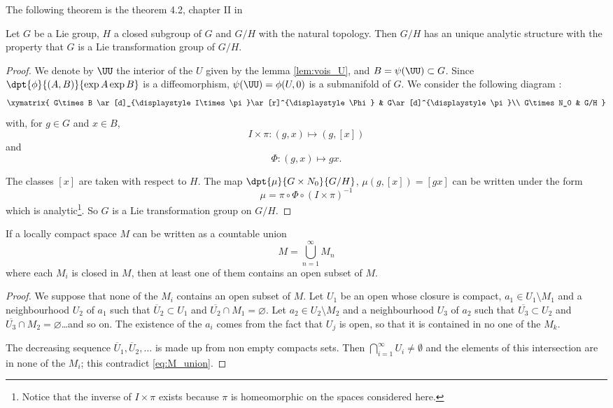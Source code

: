 The following theorem is the theorem 4.2, chapter II in \cite{Helgason}
\begin{theorem}\label{Helgason4.2}\label{tho:struc_anal}
Let $G$ be a Lie group, $H$ a closed subgroup of $G$ and $G/H$ with the natural topology. Then $G/H$ has an unique analytic structure with the property that $G$ is a Lie transformation group of $G/H$.
\end{theorem}

\begin{proof}
We denote by $\UU$ the interior of the $U$ given by the lemma \ref{lem:vois_U}, and $B=\psi(\UU)\subset G$. Since $\dpt{\phi}{(A,B)}{\exp A\exp B}$ is a diffeomorphism, $\psi(\UU)=\phi(U,0)$ is a submanifold of $G$. We consider the following diagram :
\[
\xymatrix{
    G\times B  \ar[d]_{\displaystyle I\times\pi}\ar[r]^{\displaystyle\Phi}    &     
                                                                     G\ar[d]^{\displaystyle\pi}\\
    G\times N_0 &                                                             G/H
  }\]
with, for $g\in G$ and $x\in B$,
\[
I\times\pi\colon (g,x)\mapsto (g,[x])
\]
and
\[
\Phi\colon (g,x)\mapsto gx.
\]

\noindent The classes $[x]$ are taken with respect to $H$. The map $\dpt{\mu}{G\times N_0}{G/H}$, $\mu(g,[x])=[gx]$ can be written under the form
\[
   \mu=\pi\circ\Phi\circ(I\times\pi)^{-1}
\]
which is analytic\footnote{Notice that the inverse of $I\times\pi$ exists because $\pi$ is homeomorphic on the spaces considered here.}. So $G$ is a Lie transformation group on $G/H$.

\end{proof}


\begin{lemma} \label{lem:categ}
If a locally compact space $M$ can be written as a countable union
\begin{equation}\label{eq:M_union}
   M=\bigcup_{n=1}^{\infty}M_n
\end{equation}
where each $M_i$ is closed in $M$, then at least one of them contains an open subset of $M$.
\end{lemma}

\begin{proof}
We suppose that none of the $M_i$ contains an open subset of $M$. Let $U_1$ be an open whose closure is compact, $a_1\in U_1\setminus M_1$ and a neighbourhood $U_2$ of $a_1$ such that $\overline{U}_2\subset U_1$ and $\overline{U_2}\cap M_1=\varnothing$. Let $a_2\in U_2\setminus M_2$ and a neighbourhood $U_3$ of $a_2$ such that $\overline{U_3}\subset U_2$ and $\overline{U_3}\cap M_2=\varnothing$\ldots and so on. The existence of the $a_i$ comes from the fact that $U_j$ is open, so that it is contained in no one of the $M_k$.

The decreasing sequence $\overline{U}_1,\overline{U}_2 ,\ldots$ is made up from non empty compacts sets. Then $\bigcap_{i=1}^{\infty}U_i\neq\emptyset$ and the elements of this intersection are in none of the $M_i$; this contradict \eqref{eq:M_union}.
\end{proof}


